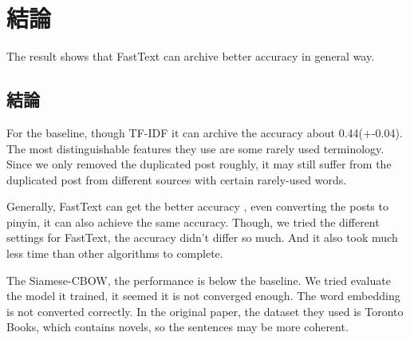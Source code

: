 \chapter{結論}

The result shows that FastText can archive better accuracy in general way.

\section{結論}


For the baseline, though TF-IDF it can archive the accuracy about 0.44(+-0.04). The most distinguishable features they use are some rarely used terminology. Since we only removed the duplicated post roughly, it may still suffer from the duplicated post from different sources with certain rarely-used words. 

Generally, FastText can get the better accuracy , even converting the posts to pinyin, it can also achieve the same accuracy. Though, we tried the different settings for FastText, the accuracy didn't differ so much. And it also took much less time than other algorithms to complete.

The Siamese-CBOW, the performance is below the baseline. We tried evaluate the model it trained, it seemed it is not converged enough. The word embedding is not converted correctly. In the original paper, the dataset they used is Toronto Books, which contains novels, so the sentences may be more coherent. 